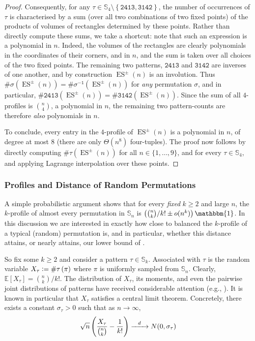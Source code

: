 \documentclass{article}
\newcommand{\Sn}{\mathbb{S}_n}
\newcommand{\E}{\mathbb{E}}
\newcommand{\pc}[2]{{\# \mathtt{ #1 } \left( #2 \right)}}
\newcommand{\eqdef}{\vcentcolon=}
\DeclareMathOperator{\ES}{ES}
\theoremstyle{remark}
\theoremstyle{plain}
\begin{document}
\begin{proof}
    Consequently, for any $\tau \in \mathbb{S}_4 \setminus \left\{ \mathtt{2413}, \mathtt{3142} \right\}$, the number of occurrences of $\tau$ is characterised by a sum (over all two combinations of two fixed points) of the products of volumes of rectangles determined by these points. Rather than directly compute these sums, we take a shortcut: note that such an expression is a polynomial in $n$. Indeed, the volumes of the rectangles are clearly polynomials in the coordinates of their corners, and in $n$, and the sum is taken over all choices of the two fixed points. The remaining two patterns, $\mathtt{2413}$ and $\mathtt{3142}$ are inverses of one another, and by construction $\ES^\pm(n)$ is an involution. Thus $\pc{\sigma}{\ES^\pm(n)} = \pc{\sigma^{-1}}{\ES^\pm(n)}$ for \emph{any} permutation $\sigma$, and in particular, $\pc{2413}{\ES^\pm(n)} = \pc{3142}{\ES^\pm(n)}$. Since the sum of all $4$-profiles is $\binom{n}{4}$, a polynomial in $n$, the remaining two pattern-counts are therefore \emph{also} polynomials in $n$.
    
    To conclude, every entry in the $4$-profile of $\ES^\pm(n)$ is a polynomial in $n$, of degree at most $8$ (there are only $\Theta(n^8)$ four-tuples). The proof now follows by directly computing $\pc{\tau}{\ES^{\pm}(n)}$ for all $n \in \{1, \dots, 9\}$, and for every $\tau \in \mathbb{S}_4$, and applying Lagrange interpolation over these points.
\end{proof}

\subsubsection{Profiles and Distance of Random Permutations}
\label{subsubsect:random_perms}

A simple probabilistic argument shows that for every \emph{fixed} $k \ge 2$ and large $n$, the $k$-profile of almost every permutation in $\Sn$ is $\left(\binom{n}{k}/k! \pm o(n^k)\right) \mathbbm{1}$. In this discussion we are interested in exactly how close to balanced the $k$-profile of a typical (random) permutation is, and in particular, whether this distance attains, or nearly attains, our lower bound of .

So fix some $k \ge 2$ and consider a pattern $\tau \in \mathbb{S}_k$. Associated with $\tau$ is the random variable $X_\tau \eqdef \pc{\tau}{\pi}$ where $\pi$ is uniformly sampled from $\Sn$. Clearly, $\E[X_\tau] = \binom{n}{k}/{k!}$. The distribution of $X_\tau$, its moments, and even the pairwise joint distributions of patterns have received considerable attention (e.g., \cite{even2020patterns, janson2013asymptotic, hofer2018central, bona2007copies}). It is known in particular that  $X_\tau$ satisfies a central limit theorem. Concretely, there exists a constant $\sigma_\tau > 0$ such that as $n \to \infty$,
\[
    \sqrt{n} \left(\frac{ X_\tau }{\binom{n}{k}} - \frac{1}{k!} \right) \xrightarrow[\hphantom{space} ]{d} N(0, \sigma_\tau)
\]
\end{document}

